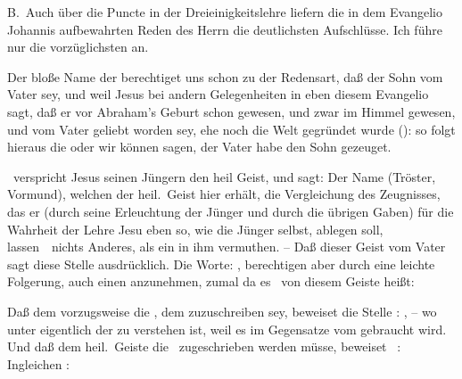 \vabst B.~Auch über die Puncte in der Dreieinigkeitslehre liefern die in dem Evangelio Johannis aufbewahrten Reden des Herrn die deutlichsten Aufschlüsse. Ich führe nur die vorzüglichsten an.
\begin{aufza}
\item Der bloße Name der  berechtiget uns schon zu der Redensart, daß der Sohn vom Vater  sey, und weil Jesus bei andern Gelegenheiten in eben diesem Evangelio sagt, daß er vor Abraham's Geburt schon gewesen, und zwar im Himmel gewesen, und vom Vater geliebt worden sey, ehe noch die Welt gegründet wurde (): so folgt hieraus die  oder wir können sagen, der Vater habe den Sohn  gezeuget.
\item {}\ verspricht Jesus seinen Jüngern den heil Geist, und sagt:  Der Name  (Tröster, Vormund), welchen der heil.\ Geist hier erhält, die Vergleichung des Zeugnisses, das er (durch seine Erleuchtung der Jünger und durch die übrigen Gaben) für die Wahrheit der Lehre Jesu eben so, wie die Jünger selbst, ablegen soll, lassen~\ nichts Anderes, als ein  in ihm vermuthen. -- Daß dieser Geist vom Vater  sagt diese Stelle ausdrücklich. Die Worte: , berechtigen aber durch eine leichte Folgerung, auch einen  anzunehmen, zumal da es \ von diesem Geiste heißt: 
\item Daß dem  vorzugsweise die , dem  zuzuschreiben sey, beweiset die Stelle : , -- wo unter  eigentlich der  zu verstehen ist, weil es im Gegensatze vom  gebraucht wird. Und daß dem heil.\ Geiste die  \usw\ zugeschrieben werden müsse, beweiset \zB\ :  Ingleichen : 
\end{aufza}

